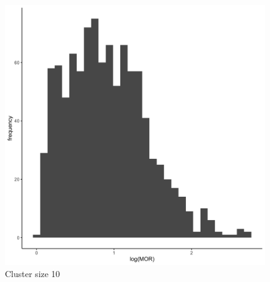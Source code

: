 \documentclass[
  letterpaper,
  DIV=11,
  numbers=noendperiod,
  titlepage]{scrartcl}
\begin{document}
\begin{figure}
\begin{minipage}[t]{0.24\linewidth}
{{\includegraphics{../../plots/two-lvl-ran-slope/high-prev/hist_10_10_two_lvl_slp_high_prev_q3.png}

}

\caption{Cluster size 10}

}

\end{minipage}%
%
\begin{minipage}[t]{0.24\linewidth}

{\centering 

}
\end{minipage}
\end{figure}
\end{document}
